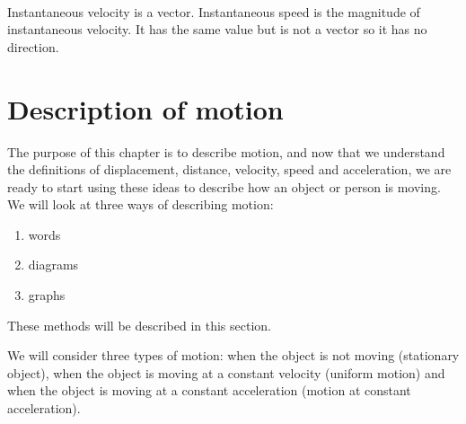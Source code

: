 \\




\label{m38791*id64664}Instantaneous velocity is a vector. Instantaneous speed is the magnitude of instantaneous velocity. It has the same value but is not a vector so it has no direction.


         \section{Description of motion}
    \nopagebreak
            \label{m38795*id68951}The purpose of this chapter is to describe motion, and now that we understand the definitions of displacement, distance, velocity, speed and acceleration, we are ready to start using these ideas to describe how an object or person is moving. We will look at three ways of describing motion:\par 
      \label{m38795*id68956}\begin{enumerate}[noitemsep, label=\textbf{\arabic*}. ] 
            \label{m38795*uid84}\item words
\label{m38795*uid85}\item diagrams
\label{m38795*uid86}\item graphs
\end{enumerate}
      \label{m38795*id68997}These methods will be described in this section.\par 
      \label{m38795*id69001}We will consider three types of motion: when the object is not moving (stationary object), when the object is moving at a constant velocity (uniform motion) and when the object is moving at a constant acceleration (motion at constant acceleration).\par 
      \label{m38795*uid87}
